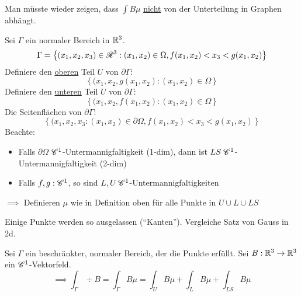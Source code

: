 \begin{Bem}
  Man müsste wieder zeigen, dass $\int B\mu$ \ul{nicht} von der Unterteilung in Graphen abhängt.
\end{Bem}
\begin{Def}
  Sei $\Gamma$ ein normaler Bereich in $\mathbb{R}^3$.
  \begin{equation}
    \label{e:11-05-302}
    \Gamma=\left\{ (x_1,x_2,x_3)\in\mathscr{R}^3:(x_1,x_2)\in\Omega, f(x_1,x_2)<x_3<g(x_1,x_2) \right\}
  \end{equation}
  Definiere den \ul{oberen} Teil $U$ von $\partial \Gamma$:
  \[ \left\{ (x_1,x_2,g(x_1,x_2): (x_1,x_2)\in\Omega \right\}\]
  Definiere den \ul{unteren} Teil $U$ von $\partial \Gamma$:
  \[ \left\{ (x_1,x_2,f(x_1,x_2): (x_1,x_2)\in\Omega \right\}\]
  Die Seitenflächen von $\partial\Gamma$:
  \[ \left\{ (x_1,x_2,x_3: (x_1,x_2)\in\partial\Omega, f(x_1,x_2)<x_3<g(x_1,x_2) \right\}\]
  Beachte:
  \begin{itemize}
    \item Falls $\partial\Omega$ $\mathscr{C}^1$-Untermannigfaltigkeit (1-dim), dann ist $LS$
      $\mathscr{C}^1$-Untermannigfaltigkeit (2-dim)
    \item Falls $f,g:\mathscr{C}^1$, so sind $L,U$ $\mathscr{C}^1$-Untermannigfaltigkeiten
  \end{itemize}
  $\implies$ Definieren $\mu$ wie in Definition oben für alle Punkte in $U\cup L\cup LS$
\end{Def}
\begin{Bem}
  Einige Punkte werden so ausgelassen (``Kanten''). Vergleiche Satz von Gauss in 2d.
\end{Bem}
\begin{Sat}
  Sei $\Gamma$ ein beschränkter, normaler Bereich, der die Punkte %
  erfüllt. Sei $B:\mathbb{R}^3\rightarrow\mathbb{R}^3$ ein $\mathscr{C}^1$-Vektorfeld.
  \begin{equation}
    \label{e:1105303}
    \implies \int_\Gamma\div B=\int_{\Gamma}B\mu=\int_UB\mu+\int_LB\mu+\int_{LS}B\mu
  \end{equation}
\end{Sat}
